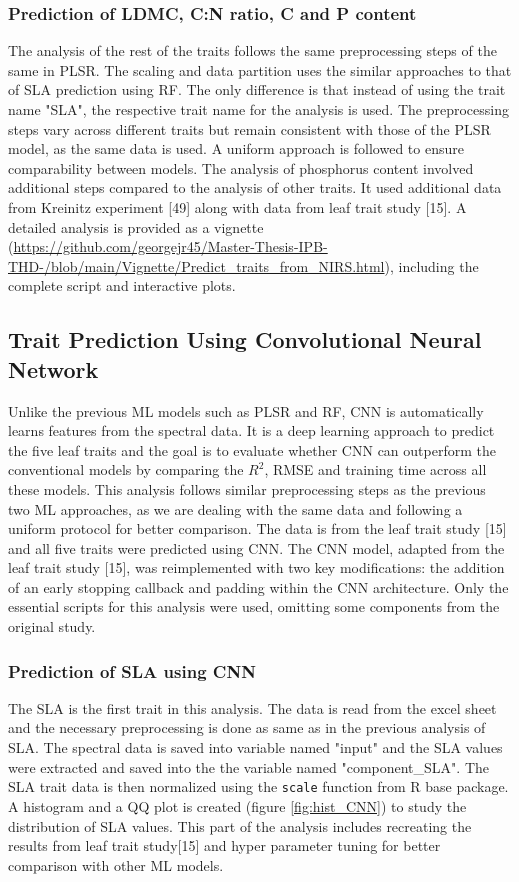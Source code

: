 \documentclass[12pt,a4paper]{report}
\begin{document}
\subsubsection*{Prediction of LDMC, C:N ratio, C and P content}
The analysis of the rest of the traits follows the same preprocessing steps of the same in PLSR. The scaling and data partition uses the similar approaches to that of SLA prediction using RF. The only difference is that instead of using the trait name "SLA", the respective trait name for the analysis is used. The preprocessing steps vary across different traits but remain consistent with those of the PLSR model, as the same data is used. A uniform approach is followed to ensure comparability between models. The analysis of phosphorus content involved additional steps compared to the analysis of other traits. It used additional data from Kreinitz experiment [49] along with data from leaf trait study [15]. A detailed analysis is provided as a vignette (\url{https://github.com/georgejr45/Master-Thesis-IPB-THD-/blob/main/Vignette/Predict_traits_from_NIRS.html}), including the complete script and interactive plots. \\


\subsection{Trait Prediction Using Convolutional Neural Network}
Unlike the previous ML models such as PLSR and RF,  CNN is automatically learns features from the spectral data. It is a deep learning approach to predict the five leaf traits and the goal is to evaluate whether CNN can outperform the conventional models by comparing the $R^2$, RMSE and training time across all these models. This analysis follows similar preprocessing steps as the previous two ML approaches, as we are dealing with the same data and following a uniform protocol for better comparison. The data is from the leaf trait study [15] and all five traits were predicted using CNN. The CNN model, adapted from the leaf trait study [15], was reimplemented with two key modifications: the addition of an early stopping callback and padding within the CNN architecture.  Only the essential scripts for this analysis were used, omitting some components from the original study. \\

\subsubsection*{Prediction of SLA using CNN}
The SLA is the first trait in this analysis. The data is read from the excel sheet and the necessary preprocessing is done as same as in the previous analysis of SLA. The spectral data is saved into variable named "input" and the SLA values were extracted and saved into the the variable named "component\_SLA". The SLA trait data is then normalized using the \texttt{scale} function from R base package. A histogram and a QQ plot is created (figure \ref{fig:hist_CNN}) to study the distribution of SLA values. This part of the analysis includes recreating the results from leaf trait study[15] and hyper parameter tuning for better comparison with other ML models. \\
\end{document}
